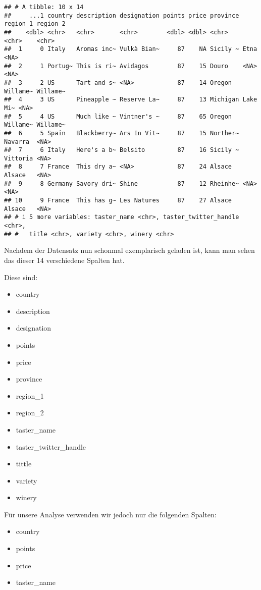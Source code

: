 \documentclass[
]{article}
\begin{document}
\begin{verbatim}
## # A tibble: 10 x 14
##     ...1 country description designation points price province region_1 region_2
##    <dbl> <chr>   <chr>       <chr>        <dbl> <dbl> <chr>    <chr>    <chr>   
##  1     0 Italy   Aromas inc~ Vulkà Bian~     87    NA Sicily ~ Etna     <NA>    
##  2     1 Portug~ This is ri~ Avidagos        87    15 Douro    <NA>     <NA>    
##  3     2 US      Tart and s~ <NA>            87    14 Oregon   Willame~ Willame~
##  4     3 US      Pineapple ~ Reserve La~     87    13 Michigan Lake Mi~ <NA>    
##  5     4 US      Much like ~ Vintner's ~     87    65 Oregon   Willame~ Willame~
##  6     5 Spain   Blackberry~ Ars In Vit~     87    15 Norther~ Navarra  <NA>    
##  7     6 Italy   Here's a b~ Belsito         87    16 Sicily ~ Vittoria <NA>    
##  8     7 France  This dry a~ <NA>            87    24 Alsace   Alsace   <NA>    
##  9     8 Germany Savory dri~ Shine           87    12 Rheinhe~ <NA>     <NA>    
## 10     9 France  This has g~ Les Natures     87    27 Alsace   Alsace   <NA>    
## # i 5 more variables: taster_name <chr>, taster_twitter_handle <chr>,
## #   title <chr>, variety <chr>, winery <chr>
\end{verbatim}

Nachdem der Datensatz nun schonmal exemplarisch geladen ist, kann man
sehen das dieser 14 verschiedene Spalten hat.

Diese sind:

\begin{itemize}
\item
  country
\item
  description
\item
  designation
\item
  points
\item
  price
\item
  province
\item
  region\_1
\item
  region\_2
\item
  taster\_name
\item
  taster\_twitter\_handle
\item
  tittle
\item
  variety
\item
  winery
\end{itemize}

Für unsere Analyse verwenden wir jedoch nur die folgenden Spalten:

\begin{itemize}
\item
  country
\item
  points
\item
  price
\item
  taster\_name
\end{itemize}
\end{document}
